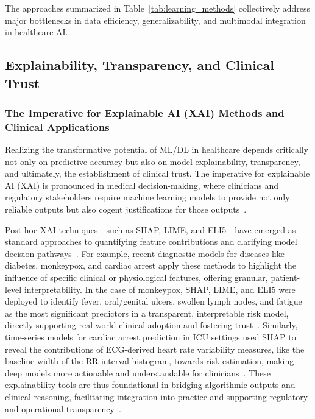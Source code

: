 \documentclass[sigconf]{acmart}
\begin{document}
The approaches summarized in Table~\ref{tab:learning_methods} collectively address major bottlenecks in data efficiency, generalizability, and multimodal integration in healthcare AI.

\subsection{Explainability, Transparency, and Clinical Trust}

\subsubsection{The Imperative for Explainable AI (XAI) Methods and Clinical Applications}

Realizing the transformative potential of ML/DL in healthcare depends critically not only on predictive accuracy but also on model explainability, transparency, and ultimately, the establishment of clinical trust. The imperative for explainable AI (XAI) is pronounced in medical decision-making, where clinicians and regulatory stakeholders require machine learning models to provide not only reliable outputs but also cogent justifications for those outputs~\cite{ref11,ref39,ref50,ref65,ref80}.

Post-hoc XAI techniques—such as SHAP, LIME, and ELI5—have emerged as standard approaches to quantifying feature contributions and clarifying model decision pathways~\cite{ref11,ref28,ref36,ref50,ref65}. For example, recent diagnostic models for diseases like diabetes, monkeypox, and cardiac arrest apply these methods to highlight the influence of specific clinical or physiological features, offering granular, patient-level interpretability. In the case of monkeypox, SHAP, LIME, and ELI5 were deployed to identify fever, oral/genital ulcers, swollen lymph nodes, and fatigue as the most significant predictors in a transparent, interpretable risk model, directly supporting real-world clinical adoption and fostering trust~\cite{ref11}. Similarly, time-series models for cardiac arrest prediction in ICU settings used SHAP to reveal the contributions of ECG-derived heart rate variability measures, like the baseline width of the RR interval histogram, towards risk estimation, making deep models more actionable and understandable for clinicians~\cite{ref80}. These explainability tools are thus foundational in bridging algorithmic outputs and clinical reasoning, facilitating integration into practice and supporting regulatory and operational transparency~\cite{ref11,ref28,ref32,ref36,ref39,ref50,ref65,ref98}.
\end{document}
